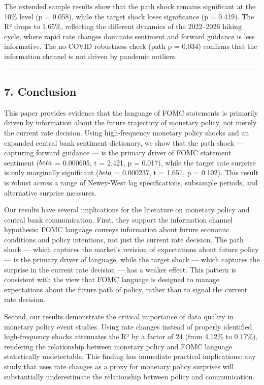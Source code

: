 \documentclass[12pt]{article}
\begin{document}
The extended sample results show that the path shock remains significant
at the 10\% level (p = 0.058), while the target shock loses significance
(p = 0.419). The R² drops to 1.65\%, reflecting the different dynamics
of the 2022--2026 hiking cycle, where rapid rate changes dominate
sentiment and forward guidance is less informative. The no-COVID
robustness check (path p = 0.034) confirms that the information channel
is not driven by pandemic outliers.

\begin{center}\rule{0.5\linewidth}{0.5pt}\end{center}

\subsection{7. Conclusion}\label{conclusion}

This paper provides evidence that the language of FOMC statements is
primarily driven by information about the future trajectory of monetary
policy, not merely the current rate decision. Using high-frequency
monetary policy shocks and an expanded central bank sentiment
dictionary, we show that the path shock --- capturing forward guidance
--- is the primary driver of FOMC statement sentiment (\(\\beta\) =
0.000605, t = 2.421, p = 0.017), while the target rate surprise is only
marginally significant (\(\\beta\) = 0.000237, t = 1.651, p = 0.102).
This result is robust across a range of Newey-West lag specifications,
subsample periods, and alternative surprise measures.

Our results have several implications for the literature on monetary
policy and central bank communication. First, they support the
information channel hypothesis: FOMC language conveys information about
future economic conditions and policy intentions, not just the current
rate decision. The path shock --- which captures the market's revision
of expectations about future policy --- is the primary driver of
language, while the target shock --- which captures the surprise in the
current rate decision --- has a weaker effect. This pattern is
consistent with the view that FOMC language is designed to manage
expectations about the future path of policy, rather than to signal the
current rate decision.

Second, our results demonstrate the critical importance of data quality
in monetary policy event studies. Using rate changes instead of properly
identified high-frequency shocks attenuates the R² by a factor of 24
(from 4.12\% to 0.17\%), rendering the relationship between monetary
policy and FOMC language statistically undetectable. This finding has
immediate practical implications: any study that uses rate changes as a
proxy for monetary policy surprises will substantially underestimate the
relationship between policy and communication.
\end{document}
